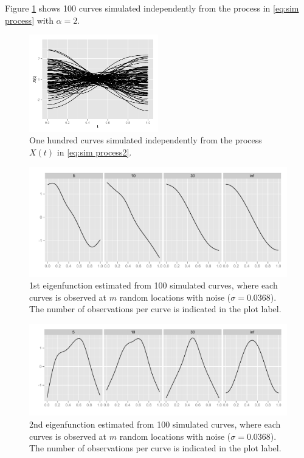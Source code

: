 Figure \ref{fig:sim curves2} shows 100 curves simulated independently from the process in \eqref{eq:sim process} with $\alpha=2$. 

\begin{figure}
\begin{center}
\includegraphics[width=0.5\textwidth]{images/Ch3/sim-curves.pdf}
\end{center}
\caption{One hundred curves simulated independently from the process $X(t)$ in \eqref{eq:sim process2}.}
\label{fig:sim curves2}
\end{figure}

\begin{figure}
\includegraphics[width=\textwidth]{images/Ch3/eigenfun1-sig-0368.pdf}
\caption{1st eigenfunction estimated from 100 simulated curves, where each curves is observed at $m$ random locations with noise ($\sigma = 0.0368$). The number of observations per curve is indicated in the plot label. }
\end{figure}

\begin{figure}
\includegraphics[width=\textwidth]{images/Ch3/eigenfun2-sig-0368.pdf}
\caption{2nd eigenfunction estimated from 100 simulated curves, where each curves is observed at $m$ random locations with noise ($\sigma = 0.0368$). The number of observations per curve is indicated in the plot label. }
\end{figure}

